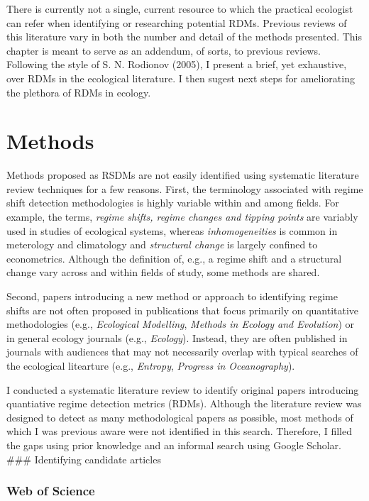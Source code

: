\documentclass[12pt,twoside,openany]{reedthesis}
\begin{document}
There is currently not a single, current resource to which the practical ecologist can refer when identifying or researching potential RDMs. Previous reviews of this literature vary in both the number and detail of the methods presented. This chapter is meant to serve as an addendum, of sorts, to previous reviews. Following the style of S. N. Rodionov (2005), I present a brief, yet exhaustive, over RDMs in the ecological literature. I then sugest next steps for ameliorating the plethora of RDMs in ecology.

\hypertarget{methods}{%
\section{Methods}\label{methods}}

Methods proposed as RSDMs are not easily identified using systematic literature review techniques for a few reasons. First, the terminology associated with regime shift detection methodologies is highly variable within and among fields. For example, the terms, \emph{regime shifts, regime changes and tipping points} are variably used in studies of ecological systems, whereas \emph{inhomogeneities} is common in meterology and climatology and \emph{structural change} is largely confined to econometrics. Although the definition of, e.g., a regime shift and a structural change vary across and within fields of study, some methods are shared.

Second, papers introducing a new method or approach to identifying regime shifts are not often proposed in publications that focus primarily on quantitative methodologies (e.g., \emph{Ecological Modelling}, \emph{Methods in Ecology and Evolution}) or in general ecology journals (e.g., \emph{Ecology}). Instead, they are often published in journals with audiences that may not necessarily overlap with typical searches of the ecological litearture (e.g., \emph{Entropy}, \emph{Progress in Oceanography}).

I conducted a systematic literature review to identify original papers introducing quantiative regime detection metrics (RDMs). Although the literature review was designed to detect as many methodological papers as possible, most methods of which I was previous aware were not identified in this search. Therefore, I filled the gaps using prior knowledge and an informal search using Google Scholar.
\#\#\# Identifying candidate articles

\hypertarget{web-of-science}{%
\subsubsection{Web of Science}\label{web-of-science}}
\end{document}

